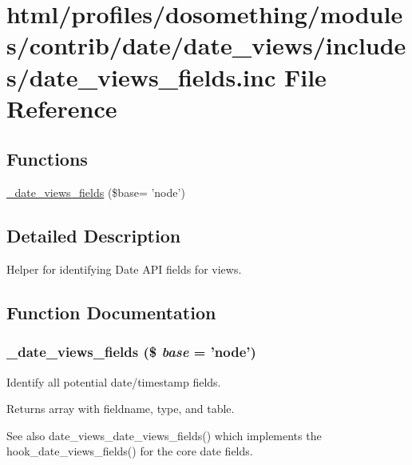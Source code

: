 \hypertarget{date__views__fields_8inc}{
\section{html/profiles/dosomething/modules/contrib/date/date\_\-views/includes/date\_\-views\_\-fields.inc File Reference}
\label{date__views__fields_8inc}
}
\subsection*{Functions}
\begin{DoxyCompactItemize}
\item 
\hyperlink{date__views__fields_8inc_a9d17c49a1ce0a778dadfeb396d06b0ee}{\_\-date\_\-views\_\-fields} (\$base= 'node')
\end{DoxyCompactItemize}


\subsection{Detailed Description}
Helper for identifying Date API fields for views. 

\subsection{Function Documentation}
\hypertarget{date__views__fields_8inc_a9d17c49a1ce0a778dadfeb396d06b0ee}{
\subsubsection[{\_\-date\_\-views\_\-fields}]{\setlength{\rightskip}{0pt plus 5cm}\_\-date\_\-views\_\-fields (\$ {\em base} = {\ttfamily 'node'})}}
\label{date__views__fields_8inc_a9d17c49a1ce0a778dadfeb396d06b0ee}
Identify all potential date/timestamp fields.

\begin{DoxyReturn}{Returns}
array with fieldname, type, and table. 
\end{DoxyReturn}
\begin{DoxySeeAlso}{See also}
date\_\-views\_\-date\_\-views\_\-fields() which implements the hook\_\-date\_\-views\_\-fields() for the core date fields. 
\end{DoxySeeAlso}
